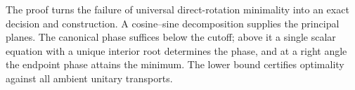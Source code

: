 The proof turns the failure of universal direct-rotation minimality into
an exact decision and construction. A cosine--sine decomposition supplies
the principal planes. The canonical phase suffices below the cutoff;
above it a single scalar equation with a unique interior root determines
the phase, and at a right angle the endpoint phase attains the minimum.
The lower bound certifies optimality against all ambient unitary transports.
